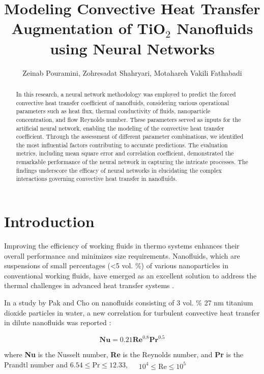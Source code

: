 \documentclass{article}
\title{Modeling Convective Heat Transfer Augmentation of TiO$_2$ Nanofluids using Neural Networks}
\author{Zeinab Pouramini, Zohresadat Shahryari, Motahareh Vakili Fathabadi }
\date{}
\begin{document}
\maketitle

\begin{abstract}
In this research, a neural network methodology was employed to predict the forced convective heat transfer coefficient of nanofluids, considering various operational parameters such as heat flux, thermal conductivity of fluids, nanoparticle concentration, and flow Reynolds number. These parameters served as inputs for the artificial neural network, enabling the modeling of the convective heat transfer coefficient. Through the assessment of different parameter combinations, we identified the most influential factors contributing to accurate predictions. The evaluation metrics, including mean square error and correlation coefficient, demonstrated the remarkable performance of the neural network in capturing the intricate processes. The findings underscore the efficacy of neural networks in elucidating the complex interactions governing convective heat transfer in nanofluids.
\end{abstract}


\section{Introduction}
Improving the efficiency of working fluids in thermo systems enhances their overall performance and minimizes size requirements. Nanofluids, which are suspensions of small percentages (<5 vol.  \%) of various nanoparticles in conventional working fluids, have emerged as an excellent solution to address the thermal challenges in advanced heat transfer systems \cite{chen2023}.

In a study by Pak and Cho on nanofluids consisting of 3 vol.  \% 27 nm titanium dioxide particles in water, a new correlation for turbulent convective heat transfer in dilute nanofluids was reported \cite{ref1}:

\begin{equation}
 \mathbf{Nu} = 0.21 \mathbf{Re}^{0.8} \mathbf{Pr}^{0.5}
\end{equation}

where  \textbf{Nu} is the Nusselt number,  \textbf{Re}  is the Reynolds number, and  \textbf{Pr} is the Prandtl number and $ 6.54 \leq \text{Pr} \leq 12.33, \quad \begin{matrix}
10^4 \leq \text{Re} \leq 10^5
\end{matrix} $
\end{document}
